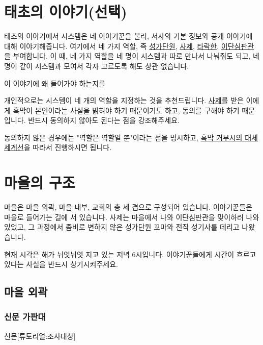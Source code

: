 \documentclass{report}
\begin{document}
	\section{태초의 이야기(선택)}
		태초의 이야기에서 시스템은 네 이야기꾼을 불러, 서사의 기본 정보와 공개 이야기에 대해 이야기해줍니다. 여기에서 네 가지 역할, 즉 \hyperlink{cursed-bard}{성가단원}, \hyperlink{cowardly-priest}{사제}, \hyperlink{corrupt-paladin}{타락한}, \hyperlink{hurt-rogue}{이단심판관}을 부여합니다. 이 때, 네 가지 역할을 네 명이 시스템과 따로 만나서 나눠줘도 되고, 네명이 같이 시스템과 모여서 각자 고르도록 해도 상관 없습니다.
		
		이 이야기에 왜 들어가야 하는지를 
		
		개인적으로는 시스템이 네 개의 역할을 지정하는 것을 추천드립니다. \hyperlink{cowardly-priest}{사제}를 받은 이에게 흑막이 본인이라는 사실을 밝혀야 하기 때문이기도 하고, 동의를 구해야 하기 때문입니다. 반드시 동의하지 않아도 된다는 점을 강조해주세요.
		
		동의하지 않은 경우에는 "역할은 역할일 뿐"이라는 점을 명시하고, \hyperlink{alternative:no-criminal}{흑막 거부시의 대체 세계선}을 따라서 진행하시면 됩니다.
	
	\section{마을의 구조}
		마을은 마을 외곽, 마을 내부, 교회의 총 세 겹으로 구성되어 있습니다. 이야기꾼들은 마을로 들어가는 길에 서 있습니다. 사제는 마을에서 나와 이단심판관을 맞이하러 나와있었고, 그 과정에서 좀비로 변하지 않은 성가단원 꼬마와 전직 성기사를 데리고 나왔습니다.
		
		현재 시각은 해가 뉘엿뉘엿 지고 있는 저녁 6시입니다. 이야기꾼들에게 시간이 흐르고 있다는 사실을 반드시 상기시켜주세요.
		
			\subsection{마을 외곽}
				\hypertarget{search:newspaper-stand}{}
				\subsubsection*{신문 가판대}
					\begin{spoiler}{신문}{[튜토리얼:조사대상]}
						
						
					\end{spoiler}
				
\end{document}
